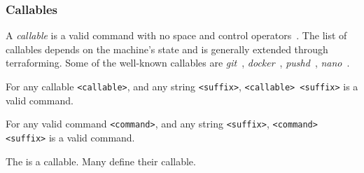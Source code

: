 \subsubsection{Callables}
\label{callables}

A \emph{callable} is a valid command with no space and control operators~. The list of callables depends on the machine's state and is generally extended through terraforming. Some of the well-known callables are \emph{git}~, \emph{docker}~, \emph{pushd}~, \emph{nano}~. 

\begin{theorem}
For any callable \texttt{<callable>}, and any string \texttt{<suffix>}, \texttt{<callable> <suffix>} is a valid command.
\end{theorem}

\begin{theorem}
For any valid command \texttt{<command>}, and any string \texttt{<suffix>}, \texttt{<command> <suffix>} is a valid command.
\end{theorem}

The  is a callable. Many  define their callable. 